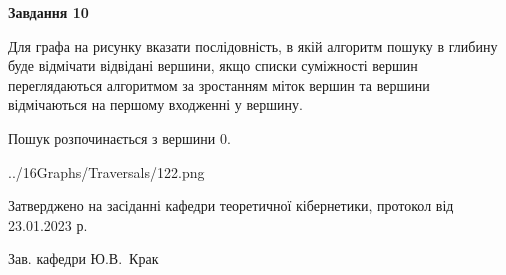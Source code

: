 \documentclass[12pt, ukrainian]{article}
\begin{document}
{\begin {large}
{\begin {center}\textbf{Завдання 10}\end {center}}\par
Для графа на рисунку вказати послідовність, в якій алгоритм пошуку в глибину буде відмічати відвідані вершини, якщо списки суміжності вершин переглядаються алгоритмом за зростанням міток вершин та вершини відмічаються на першому вход\-женні у вершину.\par
Пошук розпочинається з вершини 0.\par

\begin{center}
	{../16Graphs/Traversals/122.png}
\end{center}\par
\newpage


\end {large}
}
{\smallskip \begin {small} Затверджено на засіданні кафедри теоретичної кібернетики, протокол  від   23.01.2023 р.\par\smallskip\smallskip
{\parbox {6.5 cm}{Зав. кафедри \dotfill Ю.В.~Крак}} \end{small}}
\end{document}
